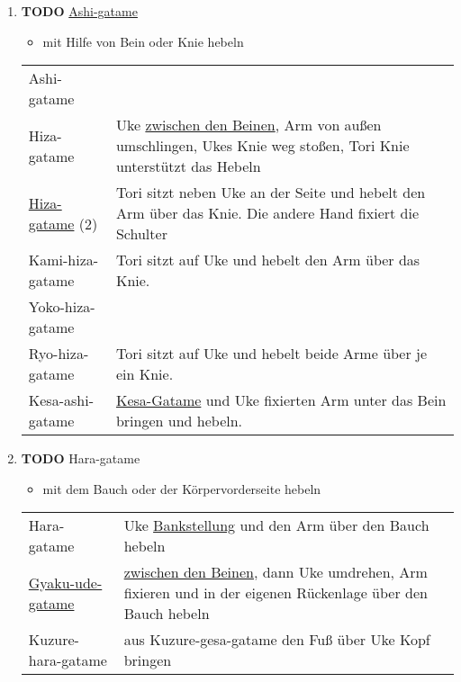 \documentclass[11pt]{article}
\begin{document}
\begin{enumerate}
\begin{enumerate}
\item {\bfseries\sffamily TODO} \hyperref[orga92f42c]{Ashi-gatame}
\label{sec:org79977bd}

\begin{itemize}
\item mit Hilfe von Bein oder Knie hebeln
\end{itemize}

\begin{center}
\begin{tabular}{ll}
\label{orga92f42c}Ashi-gatame & \\
\label{orga0a2132}Hiza-gatame & Uke \hyperref[orgd3451e7]{zwischen den Beinen}, Arm von außen umschlingen, Ukes Knie weg stoßen, Tori Knie unterstützt das Hebeln\\
\hyperref[orga0a2132]{Hiza-gatame} (2) & Tori sitzt neben Uke an der Seite und hebelt den Arm über das Knie. Die andere Hand fixiert die Schulter\\
\label{orgb044bf8}Kami-hiza-gatame & Tori sitzt auf Uke und hebelt den Arm über das Knie.\\
\label{org63601e1}Yoko-hiza-gatame & \\
\label{org622d8b5}Ryo-hiza-gatame & Tori sitzt auf Uke und hebelt beide Arme über je ein Knie.\\
\label{org2c7b0dd}Kesa-ashi-gatame & \hyperref[org0fccb72]{Kesa-Gatame} und Uke fixierten Arm unter das Bein bringen und hebeln.\\
\end{tabular}
\end{center}

\item {\bfseries\sffamily TODO} Hara-gatame
\label{sec:org1499000}

\begin{itemize}
\item mit dem Bauch oder der Körpervorderseite hebeln
\end{itemize}

\begin{center}
\begin{tabular}{ll}
Hara-gatame & Uke \hyperref[orgbc37293]{Bankstellung} und den Arm über den Bauch hebeln\\
\hyperref[org2e51b6d]{Gyaku-ude-gatame} & \hyperref[orgd3451e7]{zwischen den Beinen}, dann Uke umdrehen, Arm fixieren und in der eigenen Rückenlage über den Bauch hebeln\\
Kuzure-hara-gatame & aus Kuzure-gesa-gatame den Fuß über Uke Kopf bringen\\
\end{tabular}
\end{center}


\end{enumerate}
\end{enumerate}
\end{document}
